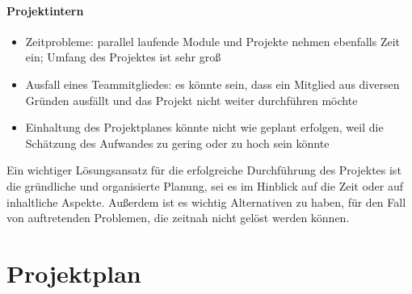 \documentclass[12pt]{scrartcl}
\begin{document}
\paragraph{Projektintern}
\begin{itemize}
\item Zeitprobleme: parallel laufende Module und Projekte nehmen ebenfalls Zeit ein; Umfang des Projektes ist sehr groß 
\item Ausfall eines Teammitgliedes: es könnte sein, dass ein Mitglied aus diversen Gründen ausfällt und das Projekt nicht weiter durchführen möchte
\item Einhaltung des Projektplanes könnte nicht wie geplant erfolgen, weil die Schätzung des Aufwandes zu gering oder zu hoch sein könnte
\end{itemize}


Ein wichtiger Lösungsansatz für die erfolgreiche Durchführung des Projektes ist die gründliche und organisierte Planung, sei es im Hinblick auf die Zeit oder auf inhaltliche Aspekte.  Außerdem ist es wichtig Alternativen zu haben, für den Fall von auftretenden Problemen, die zeitnah nicht gelöst werden können.


\section{Projektplan}



\end{document}
